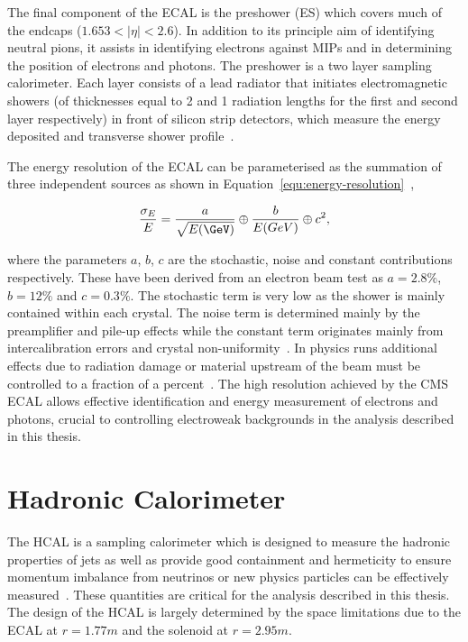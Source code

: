 The final component of the ECAL is the preshower (ES) which covers much of the endcaps ($1.653 < |\eta| < 2.6$). In addition
to its principle aim of identifying neutral pions, it assists in identifying electrons against MIPs and in
determining the position of electrons and photons. The preshower is a two layer sampling calorimeter. Each layer
consists of a lead radiator that initiates electromagnetic showers (of thicknesses equal to 2 and 1 radiation lengths for the 
first and second layer respectively) in front of silicon strip detectors, which 
measure the energy deposited and transverse shower profile~\cite{ecal_tdr}.  

The energy resolution of the ECAL can be parameterised as the summation of three independent sources as shown 
in Equation~\ref{equ:energy-resolution}~\cite{ecal_performance2},

\begin{equation}
\frac{\sigma_E}{E} = \frac{a}{\sqrt{E(\GeV)}} \oplus \frac{b}{E(GeV)} \oplus c^2,
\label{equ:energy-resolution}
\end{equation}

where the parameters $a$, $b$, $c$ are the stochastic, noise and constant contributions respectively. These have been
derived from an electron beam test as $a=2.8\%$, $b=12\%$ and $c=0.3\%$. The stochastic
term is very low as the shower is mainly contained within each crystal. The noise term is determined mainly by 
the preamplifier and pile-up effects while the constant term originates mainly from intercalibration errors and crystal non-uniformity~\cite{ecal_tdr}. 
In physics runs additional effects due to radiation damage or material upstream of the beam must be controlled to a 
fraction of a percent~\cite{ecal_performance}. The high resolution achieved by the CMS ECAL allows effective identification and energy measurement of electrons and photons, crucial to
controlling electroweak backgrounds in the analysis described in this thesis.

\section{Hadronic Calorimeter}

The HCAL is a sampling calorimeter which is designed to measure the hadronic properties of jets as well as provide good 
containment and hermeticity to ensure momentum imbalance from neutrinos or new physics particles can be 
effectively measured~\cite{hcal_tdr}.
These quantities are critical for the analysis described in this thesis.
The design of the HCAL is largely determined by the space limitations due to the ECAL at $r = 1.77 m$ and the solenoid at $r = 2.95 m$.

